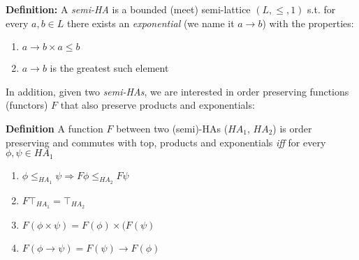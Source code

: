 			\begin{mdframed}
			\textbf{Definition:}
			A \textit{semi-HA} is a bounded (meet) semi-lattice $(L,\le, 1)$ 
			s.t. for every $a,b\in L$ there exists an \textit{exponential} 
			(we name it $a\rightarrow b$) 
			with the properties: 
			\begin{enumerate}
			\item $a\rightarrow b\times a\le b $
			\item $a\rightarrow b$ is the greatest such element
			\end{enumerate}
			\end{mdframed}
			
			
			In addition, given two \emph{semi-HAs}, we are 
			interested in order preserving 
			functions (functors) $F$ that also preserve products and exponentials: 
			\begin{mdframed}
				\textbf{Definition}
			A function $F$ between two (semi)-HAs ($HA_1$, $HA_2$) is order preserving
			and commutes with top, products and exponentials \emph{iff} for every 
			$\phi,\psi \in HA_1$
				\begin{enumerate}
				\item $\phi\le_{HA_1}\psi\Rightarrow F\phi\le_{HA_2}F\psi$
				\item $F\top_{HA_1} = \top_{HA_2}$ 
				\item{$F(\phi \times\psi) = F(\phi)\times(F(\psi)$} 
				\item $F(\phi\rightarrow \psi) = F(\psi)\rightarrow F(\phi)$
				\end{enumerate}
			\end{mdframed}
			
